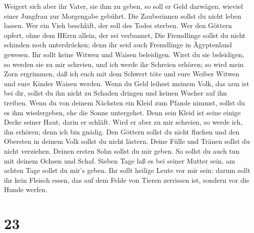  Weigert sich aber ihr Vater, sie ihm zu geben, so soll er
Geld darwägen, wieviel einer Jungfrau zur Morgengabe gebührt.
 Die Zauberinnen sollst du nicht leben lassen.
 Wer ein Vieh beschläft, der soll des Todes sterben.
 Wer den Göttern opfert, ohne dem HErrn allein, der sei
verbannet,  Die Fremdlinge sollst du nicht schinden noch
unterdrücken; denn ihr seid auch Fremdlinge in Ägyptenland gewesen.
 Ihr sollt keine Witwen und Waisen beleidigen.
 Wirst du sie beleidigen, so werden sie zu mir schreien,
und ich werde ihr Schreien erhören;  so wird mein Zorn
ergrimmen, daß ich euch mit dem Schwert töte und eure Weiber Witwen und
eure Kinder Waisen werden.  Wenn du Geld leihest meinem
Volk, das arm ist bei dir, sollst du ihn nicht zu Schaden dringen und
keinen Wucher auf ihn treiben.  Wenn du von deinem Nächsten
ein Kleid zum Pfande nimmst, sollst du es ihm wiedergeben, ehe die Sonne
untergehet.  Denn sein Kleid ist seine einige Decke seiner
Haut, darin er schläft. Wird er aber zu mir schreien, so werde ich, ihn
erhören; denn ich bin gnädig.  Den Göttern sollst du nicht
fluchen und den Obersten in deinem Volk sollst du nicht lästern.
 Deine Fülle und Tränen sollst du nicht verziehen. Deinen
ersten Sohn sollst du mir geben.  So sollst du auch tun mit
deinem Ochsen und Schaf. Sieben Tage laß es bei seiner Mutter sein, am
achten Tage sollst du mir's geben.  Ihr sollt heilige Leute
vor mir sein: darum sollt ihr kein Fleisch essen, das auf dem Felde von
Tieren zerrissen ist, sondern vor die Hunde werfen.

\hypertarget{section-22}{%
\section{23}\label{section-22}}

